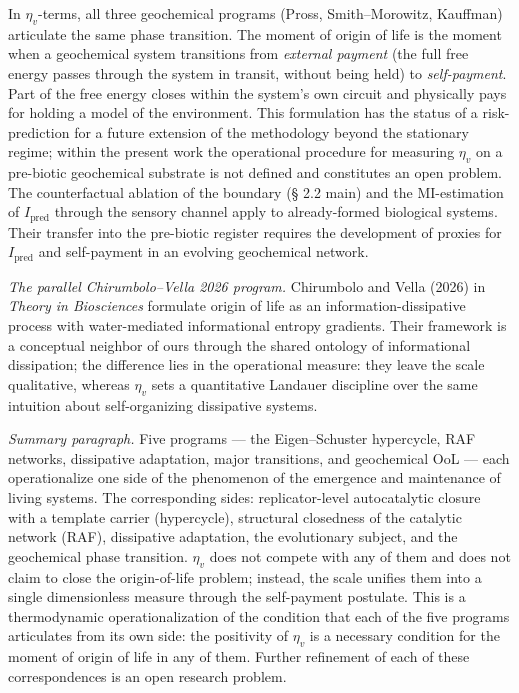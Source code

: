 \documentclass[pdflatex,sn-mathphys-ay]{sn-jnl}
\begin{document}
In \(\eta_v\)-terms, all three geochemical programs (Pross, Smith--Morowitz, Kauffman) articulate the same phase transition. The moment of origin of life is the moment when a geochemical system transitions from \emph{external payment} (the full free energy passes through the system in transit, without being held) to \emph{self-payment}. Part of the free energy closes within the system's own circuit and physically pays for holding a model of the environment. This formulation has the status of a risk-prediction for a future extension of the methodology beyond the stationary regime; within the present work the operational procedure for measuring \(\eta_v\) on a pre-biotic geochemical substrate is not defined and constitutes an open problem. The counterfactual ablation of the boundary (§ 2.2 main) and the MI-estimation of \(I_{\text{pred}}\) through the sensory channel apply to already-formed biological systems. Their transfer into the pre-biotic register requires the development of proxies for \(I_{\text{pred}}\) and self-payment in an evolving geochemical network.

\emph{The parallel Chirumbolo--Vella 2026 program.} Chirumbolo and Vella (2026) in \emph{Theory in Biosciences} formulate origin of life as an information-dissipative process with water-mediated informational entropy gradients. Their framework is a conceptual neighbor of ours through the shared ontology of informational dissipation; the difference lies in the operational measure: they leave the scale qualitative, whereas \(\eta_v\) sets a quantitative Landauer discipline over the same intuition about self-organizing dissipative systems.

\emph{Summary paragraph.} Five programs --- the Eigen--Schuster hypercycle, RAF networks, dissipative adaptation, major transitions, and geochemical OoL --- each operationalize one side of the phenomenon of the emergence and maintenance of living systems. The corresponding sides: replicator-level autocatalytic closure with a template carrier (hypercycle), structural closedness of the catalytic network (RAF), dissipative adaptation, the evolutionary subject, and the geochemical phase transition. \(\eta_v\) does not compete with any of them and does not claim to close the origin-of-life problem; instead, the scale unifies them into a single dimensionless measure through the self-payment postulate. This is a thermodynamic operationalization of the condition that each of the five programs articulates from its own side: the positivity of \(\eta_v\) is a necessary condition for the moment of origin of life in any of them. Further refinement of each of these correspondences is an open research problem.
\end{document}
